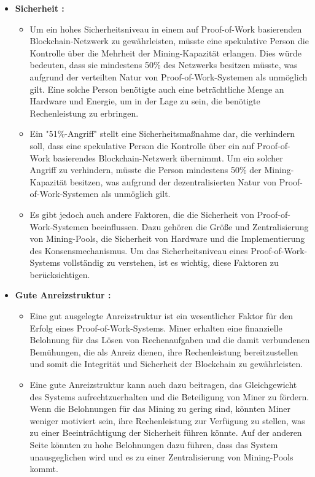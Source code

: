 \documentclass[ngerman]{scrreprt}
\begin{document}
\begin{itemize}
	\item \textbf{Sicherheit :}
	\begin{itemize}
		\item Um ein hohes Sicherheitsniveau in einem auf Proof-of-Work basierenden Blockchain-Netzwerk zu gewährleisten, müsste eine spekulative Person die Kontrolle über die Mehrheit der Mining-Kapazität erlangen. Dies würde bedeuten, dass sie mindestens 50\% des Netzwerks besitzen müsste, was aufgrund der verteilten Natur von Proof-of-Work-Systemen als unmöglich gilt. Eine solche Person benötigte auch eine beträchtliche Menge an Hardware und Energie, um in der Lage zu sein, die benötigte Rechenleistung zu erbringen.
		
		\item Ein "51\%-Angriff" stellt eine Sicherheitsmaßnahme dar, die verhindern soll, dass eine spekulative Person die Kontrolle über ein auf Proof-of-Work basierendes Blockchain-Netzwerk übernimmt. Um ein solcher Angriff zu verhindern, müsste die Person mindestens 50\% der Mining-Kapazität besitzen, was aufgrund der dezentralisierten Natur von Proof-of-Work-Systemen als unmöglich gilt.
		
		\item Es gibt jedoch auch andere Faktoren, die die Sicherheit von Proof-of-Work-Systemen beeinflussen. Dazu gehören die Größe und Zentralisierung von Mining-Pools, die Sicherheit von Hardware und die Implementierung des Konsensmechanismus. Um das Sicherheitsniveau eines Proof-of-Work-Systems vollständig zu verstehen, ist es wichtig, diese Faktoren zu berücksichtigen.
	\end{itemize}
	\item \textbf{Gute Anreizstruktur :}
	\begin{itemize}
		\item Eine gut ausgelegte Anreizstruktur ist ein wesentlicher Faktor für den Erfolg eines Proof-of-Work-Systems. Miner erhalten eine finanzielle Belohnung für das Lösen von Rechenaufgaben und die damit verbundenen Bemühungen, die als Anreiz dienen, ihre Rechenleistung bereitzustellen und somit die Integrität und Sicherheit der Blockchain zu gewährleisten.
		
		\item Eine gute Anreizstruktur kann auch dazu beitragen, das Gleichgewicht des Systems aufrechtzuerhalten und die Beteiligung von Miner zu fördern. Wenn die Belohnungen für das Mining zu gering sind, könnten Miner weniger motiviert sein, ihre Rechenleistung zur Verfügung zu stellen, was zu einer Beeinträchtigung der Sicherheit führen könnte. Auf der anderen Seite könnten zu hohe Belohnungen dazu führen, dass das System unausgeglichen wird und es zu einer Zentralisierung von Mining-Pools kommt.
		

\end{itemize}
\end{itemize}
\end{document}
